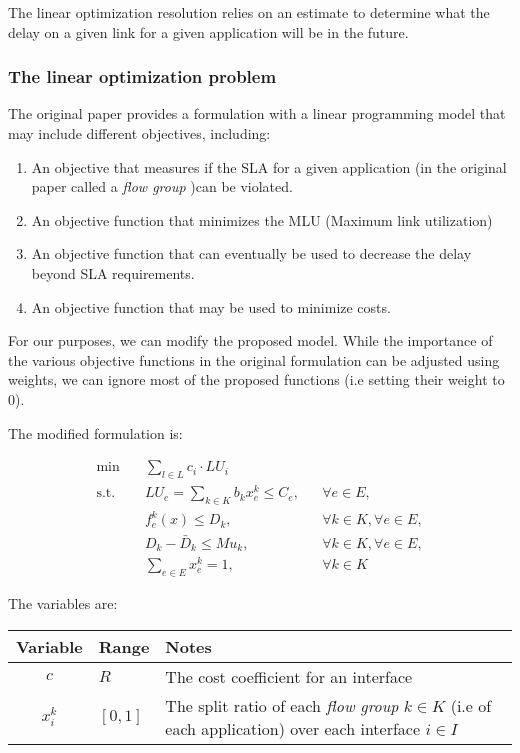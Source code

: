 \documentclass{report}
\begin{document}
The linear optimization resolution relies on an estimate to determine what the delay on a given link for a given application will be in the future.

\subsubsection{The linear optimization problem}

The original paper provides a formulation with a linear programming model that may include different objectives, including:

\begin{enumerate}
	\item An objective that measures if the SLA for a given application (in the original paper called a \textit{flow group} )can be violated.
	\item An objective function that minimizes the MLU (Maximum link utilization)
	\item An objective function that can eventually be used to decrease the delay beyond SLA requirements.
	\item An objective function that may be used to minimize costs.
\end{enumerate}

For our purposes, we can  modify the proposed model. While the importance of the various objective functions in the original formulation can be adjusted using weights, we can ignore most of the proposed functions (i.e setting their weight to 0).

The modified formulation is:
\begin{center}
\begin{align}
	\min & \quad \sum_{l \in L} c_i \cdot LU_i  \tag{1}
	\label{eq:objective}
	 \\
	\text{s.t.} 
	& \quad LU_e = \sum_{k \in K} b_k x^k_e \leq C_e, 
	&& \forall e \in E, \tag{2} \\
	& \quad f^k_e(x) \leq D_k, 
	&& \forall k \in K, \forall e \in E, \tag{3} \\
	& \quad D_k - \bar{D}_k \leq M u_k, 
	&& \forall k \in K, \forall e \in E, \tag{4} \\
	& \quad \sum_{e \in E} x^k_e = 1, 
	&& \forall k \in K \tag{5}
\end{align}
\end{center}

The variables are:
\begin{center}
    \begin{table}[htb]
	\centering
	\makegapedcells
	\begin{tabular}{|c|l|p{9cm}|}
		\hline
		Variable  & Range & Notes \text{ values}   \\ \hline
 		$c$       & $R$ & The cost coefficient for an interface   \\ \hline
 		$x^k_i$       & $[0,1]$ & The split ratio of each \textit{flow group} $k \in K$ (i.e of each application) over each interface $i \in I$ \\ \hline
	\end{tabular}
\end{table}
\end{center}
\end{document}
